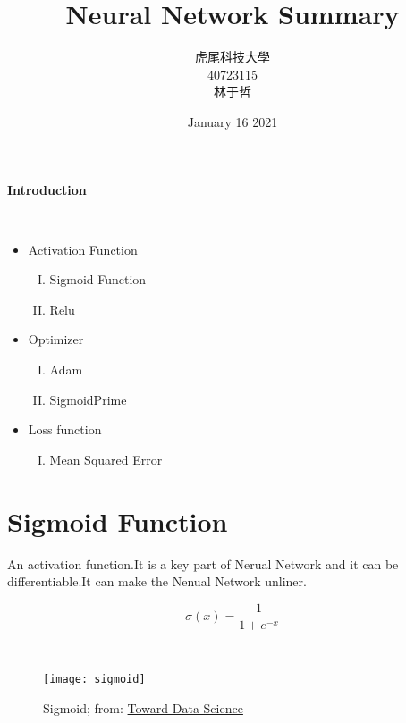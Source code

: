 \documentclass[12pt,a4paper]{article}
\title{Neural Network Summary}
\author{虎尾科技大學\\40723115\\ 林于哲}
\date{January 16 2021}
\begin{document}
\maketitle
\tableofcontents

\newpage
\begin{huge}\textbf{Introduction}\end{huge}\\
\begin{itemize}
\item Activation Function 
   \begin{enumerate}[I.]
   \item Sigmoid Function
   \item Relu
   \end{enumerate}
\end{itemize}   
\begin{itemize}
\item Optimizer
   \begin{enumerate}[I.]
   \item Adam
   \item SigmoidPrime
   \end{enumerate}
\end{itemize}  
\begin{itemize}   
\item Loss function
   \begin{enumerate}[I.]
   \item Mean Squared Error
   \end{enumerate}
\end{itemize} 


\section{Sigmoid Function}
An activation function.It is a key part of Nerual Network and it can be differentiable.It can make the Nenual Network unliner.\\
\begin{Large}$$\sigma(x)=\frac{1}{1+e^{-x}}$$ \end{Large}\\[6pt]
\begin{figure}[hbt!]
\begin{center}
\texttt{[image: sigmoid]}
\caption{Sigmoid; from: \href{https://towardsdatascience.com/derivative-of-the-sigmoid-function-536880cf918e}{Toward Data Science}}
\end{center}
\end{figure}
\end{document}
